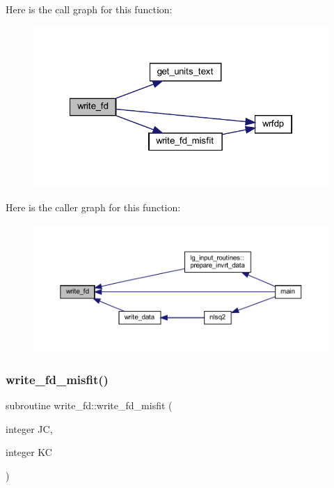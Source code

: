 Here is the call graph for this function\+:\nopagebreak
\begin{figure}[H]
\begin{center}
\leavevmode
\includegraphics[width=322pt]{Leroi_8f90_ab3f62aa9d1d60322e81296cc809df15f_cgraph}
\end{center}
\end{figure}
Here is the caller graph for this function\+:\nopagebreak
\begin{figure}[H]
\begin{center}
\leavevmode
\includegraphics[width=350pt]{Leroi_8f90_ab3f62aa9d1d60322e81296cc809df15f_icgraph}
\end{center}
\end{figure}
\mbox{\label{Leroi_8f90_a099fdc373643714db817e823ef93b622}} 
\subsubsection{\texorpdfstring{write\+\_\+fd\+\_\+misfit()}{write\_fd\_misfit()}}
{\footnotesize\ttfamily subroutine write\+\_\+fd\+::write\+\_\+fd\+\_\+misfit (\begin{DoxyParamCaption}\item[{integer}]{JC,  }\item[{integer}]{KC }\end{DoxyParamCaption})}

